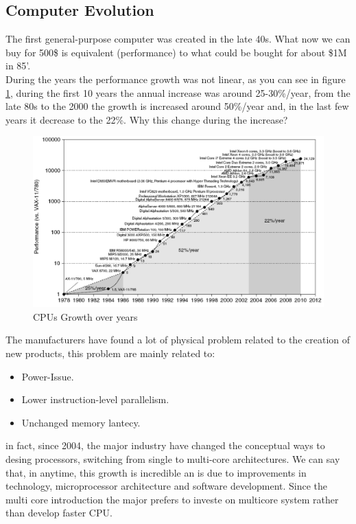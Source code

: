\documentclass[12pt]{article}
\begin{document}
\subsection{Computer Evolution}
The first general-purpose computer was created in the late 40s. What now we can buy for 500\$ is equivalent (performance) to what could be bought for about \$1M in 85'.\\
During the years the performance growth was not linear, as you can see in figure \ref{fig:cpugrowth}, during the first 10 years the annual increase was around 25-30\%/year, from the late 80s to the 2000 the growth is increased around 50\%/year and, in the last few years it decrease to the 22\%. Why this change during the increase?\\
\begin{figure}[h!]
  \centering
  \includegraphics[width=\linewidth]{images/cpugrowth.png}
  \caption{CPUs Growth over years}
  \label{fig:cpugrowth}
\end{figure}
The manufacturers have found a lot of physical problem related to the creation of new products, this problem are mainly related to:
\begin{itemize}
  \item Power-Issue.
  \item Lower instruction-level parallelism.
  \item Unchanged memory lantecy.
\end{itemize}
in fact, since 2004, the major industry have changed the conceptual ways to desing processors, switching from single to multi-core architectures. We can say that, in anytime, this growth is incredible an is due to improvements in technology, microprocessor architecture and software development. Since the multi core introduction the major prefers to investe on multicore system rather than develop faster CPU.\\
\end{document}
